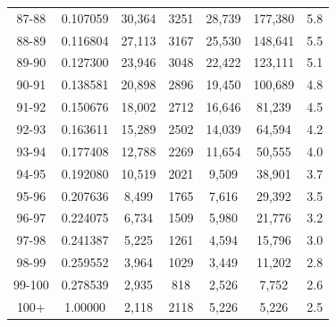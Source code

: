 \documentclass[10pt,a4paper]{article}
\begin{document}
\begin{longtable}{|c|c|c|c|c|c|c|}
87-88  & 0.107059      & 30,364       & 3251          & 28,739        & 177,380      & 5.8          \\
88-89  & 0.116804      & 27,113       & 3167          & 25,530        & 148,641      & 5.5          \\
89-90  & 0.127300      & 23,946       & 3048          & 22,422        & 123,111      & 5.1          \\
90-91  & 0.138581      & 20,898       & 2896          & 19,450        & 100,689      & 4.8          \\
91-92  & 0.150676      & 18,002       & 2712          & 16,646        & 81,239       & 4.5          \\
92-93  & 0.163611      & 15,289       & 2502          & 14,039        & 64,594       & 4.2          \\
93-94  & 0.177408      & 12,788       & 2269          & 11,654        & 50,555       & 4.0          \\
94-95  & 0.192080      & 10,519       & 2021          & 9,509         & 38,901       & 3.7          \\
95-96  & 0.207636      & 8,499        & 1765          & 7,616         & 29,392       & 3.5          \\
96-97  & 0.224075      & 6,734        & 1509          & 5,980         & 21,776       & 3.2          \\
97-98  & 0.241387      & 5,225        & 1261          & 4,594         & 15,796       & 3.0          \\
98-99  & 0.259552      & 3,964        & 1029          & 3,449         & 11,202       & 2.8          \\
99-100 & 0.278539      & 2,935        & 818           & 2,526         & 7,752        & 2.6          \\
100+   & 1.00000       & 2,118        & 2118          & 5,226         & 5,226        & 2.5          \\
\hline
\end{longtable}

\addappheadtotoc
\end{document}
